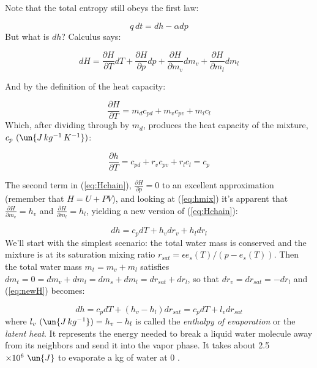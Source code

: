 \documentclass[12pt]{article}
\begin{document}
Note that the total entropy still obeys the first law:

\begin{equation}
  \label{eq:first}
  q\,dt= dh - \alpha dp
\end{equation}
But what is $dh$?  Calculus says:

\begin{equation}
  \label{eq:Hchain}
  dH = \frac{\partial H}{\partial T} dT + 
       \frac{\partial H}{\partial p} dp +
       \frac{\partial H}{\partial m_v} d m_v + 
       \frac{\partial H}{\partial m_l} d m_l
\end{equation}

And by the definition of the heat capacity:

\begin{equation}
  \label{eq:partialT}
  \frac{\partial H}{\partial T} = m_d c_{pd} + m_v c_{pv} + m_l c_l
\end{equation}
Which, after dividing through by $m_d$, produces the heat
capacity of the mixture, $c_p\ (\un{J\,kg^{-1}\,K^{-1}})$:

\begin{equation}
  \label{eq:partialTspec}
  \frac{\partial h}{\partial T} =  c_{pd} + r_v c_{pv} + r_l c_l = 
      c_p
\end{equation}

The second term in (\ref{eq:Hchain}),
$\frac{\partial H}{\partial p}=0$ to an excellent approximation
(remember that $H=U + PV$), and looking at (\ref{eq:hmix}) it's
apparent that $\frac{\partial H}{\partial m_v}=h_v$ and
$\frac{\partial H}{\partial m_l}=h_l$, yielding a new version of
(\ref{eq:Hchain}):

\begin{equation}
  \label{eq:newH}
  dh = c_p dT + 
       h_v d r_v +
       h_l d r_l
\end{equation}
We'll start with the simplest scenario: the total water mass is
conserved and the mixture is at its saturation mixing ratio
$r_{sat} = \epsilon e_s(T)/(p - e_s(T))$.  Then the total water mass
$m_t=m_v + m_l$  satisfies 
$d m_t = 0 = d m_v + d m_l = d m_s + dm_l = d r_{sat} + d r_l$, so
that $dr_v = d r_{sat} = - d r_l$ and (\ref{eq:newH}) becomes:

\begin{equation}
  \label{eq:newHsat}
  dh = c_p dT + 
       (h_v - h_l) d r_{sat} = c_p dT + l_v d r_{sat}
\end{equation}
where $l_v\ (\un{J\,kg^{-1}}) = h_v - h_l$ 
is called the \textit{enthalpy of evaporation}
or the \textit{latent heat}.  It represents the energy needed to
break a liquid water molecule away from its neighbors and send it
into  the vapor phase.  It takes about 2.5 
$\times 10^{6}\ \un{J}$ to evaporate a kg of water at
0 \degc.
\end{document}
